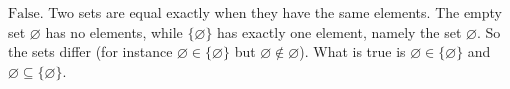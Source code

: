 $\boxed{\text{False.}}$ Two sets are equal exactly when they have the same elements. The empty set $\varnothing$ has no elements, while $\{\varnothing\}$ has exactly one element, namely the set $\varnothing$. So the sets differ (for instance $\varnothing\in\{\varnothing\}$ but $\varnothing\notin\varnothing$). What is true is $\varnothing\in\{\varnothing\}$ and $\varnothing\subseteq\{\varnothing\}$.
